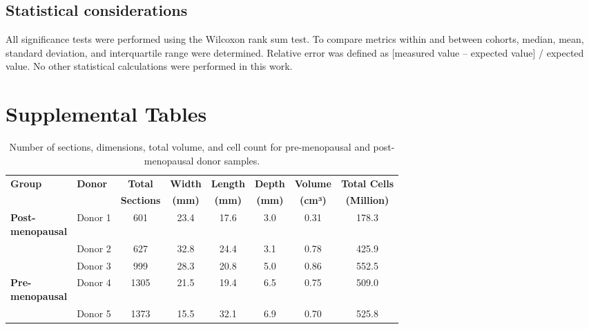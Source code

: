 \begin{refsection}
    \subsection{Statistical considerations}
    All significance tests were performed using the Wilcoxon rank sum test. To compare metrics within and between cohorts, median, mean, standard deviation, and interquartile range were determined. Relative error was defined as [measured value – expected value] / expected value. No other statistical calculations were performed in this work.

    \clearpage
    \section{Supplemental Tables}
    
    \begin{table}[htbp]
        \centering
        \footnotesize
        \renewcommand{\arraystretch}{1.2}
        \caption{Number of sections, dimensions, total volume, and cell count for pre-menopausal and post-menopausal donor samples.}
        \label{chapter3_table_S1}
        \begin{tabularx}{\textwidth}{l l c c c c c c}
            \toprule
            \textbf{Group} & \textbf{Donor} & \textbf{Total} & \textbf{Width} & \textbf{Length} & \textbf{Depth} & \textbf{Volume} & \textbf{Total Cells} \\
            & & \textbf{Sections} & \textbf{(mm)} & \textbf{(mm)} & \textbf{(mm)} & \textbf{(cm³)} & \textbf{(Million)} \\
            \midrule
            \makecell[l]{\textbf{Post-}\\\textbf{menopausal}} & Donor 1 & 601 & 23.4 & 17.6 & 3.0 & 0.31 & 178.3 \\
            & Donor 2 & 627 & 32.8 & 24.4 & 3.1 & 0.78 & 425.9 \\
            & Donor 3 & 999 & 28.3 & 20.8 & 5.0 & 0.86 & 552.5 \\
            \makecell[l]{\textbf{Pre-}\\\textbf{menopausal}} & Donor 4 & 1305 & 21.5 & 19.4 & 6.5 & 0.75 & 509.0 \\
            & Donor 5 & 1373 & 15.5 & 32.1 & 6.9 & 0.70 & 525.8 \\
            \bottomrule
        \end{tabularx}
    \end{table}
    

\end{refsection}
